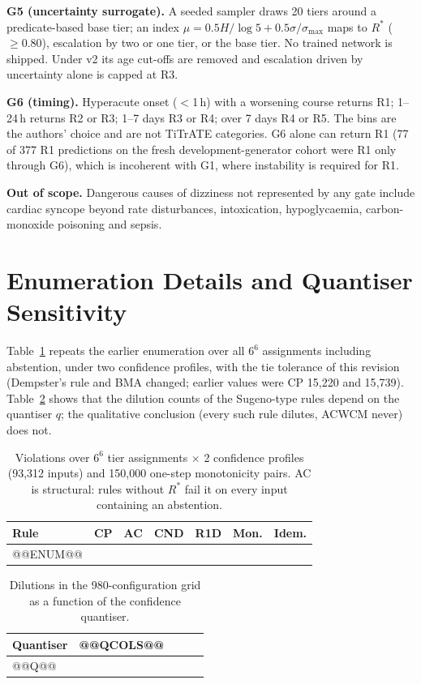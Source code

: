 \documentclass[11pt,a4paper]{article}%
\theoremstyle{plain}%
\theoremstyle{remark}%
\begin{document}
\textbf{G5 (uncertainty surrogate).} A seeded sampler draws 20 tiers around a predicate-based base tier; an index $\mu=0.5H/\log5+0.5\sigma/\sigma_{\max}$ maps to $R^*$ ($\ge0.80$), escalation by two or one tier, or the base tier. No trained network is shipped. Under v2 its age cut-offs are removed and escalation driven by uncertainty alone is capped at R3.

\textbf{G6 (timing).} Hyperacute onset ($<$1\,h) with a worsening course returns R1; 1--24\,h returns R2 or R3; 1--7 days R3 or R4; over 7 days R4 or R5. The bins are the authors' choice and are not TiTrATE categories. G6 alone can return R1 (77 of 377 R1 predictions on the fresh development-generator cohort were R1 only through G6), which is incoherent with G1, where instability is required for R1.

\textbf{Out of scope.} Dangerous causes of dizziness not represented by any gate include cardiac syncope beyond rate disturbances, intoxication, hypoglycaemia, carbon-monoxide poisoning and sepsis.

\section{Enumeration Details and Quantiser Sensitivity}\label{sup:enum}

Table~\ref{tab:enum66} repeats the earlier enumeration over all $6^6$ assignments including abstention, under two confidence profiles, with the tie tolerance of this revision (Dempster's rule and BMA changed; earlier values were CP 15{,}220 and 15{,}739). Table~\ref{tab:quant} shows that the dilution counts of the Sugeno-type rules depend on the quantiser $q$; the qualitative conclusion (every such rule dilutes, ACWCM never) does not.

\begin{table}[h]
\caption{Violations over $6^6$ tier assignments $\times$ 2 confidence profiles (93{,}312 inputs) and 150{,}000 one-step monotonicity pairs. AC is structural: rules without $R^*$ fail it on every input containing an abstention.}\label{tab:enum66}
\small
\begin{tabular}{@{}lrrrrrr@{}}
\toprule
Rule & CP & AC & CND & R1D & Mon. & Idem. \\
\midrule
@@ENUM@@
\bottomrule
\end{tabular}
\end{table}

\begin{table}[h]
\caption{Dilutions in the 980-configuration grid as a function of the confidence quantiser.}\label{tab:quant}
\small
\begin{tabular}{@{}lrrrr@{}}
\toprule
Quantiser & @@QCOLS@@ \\
\midrule
@@Q@@
\bottomrule
\end{tabular}
\end{table}
\end{document}
